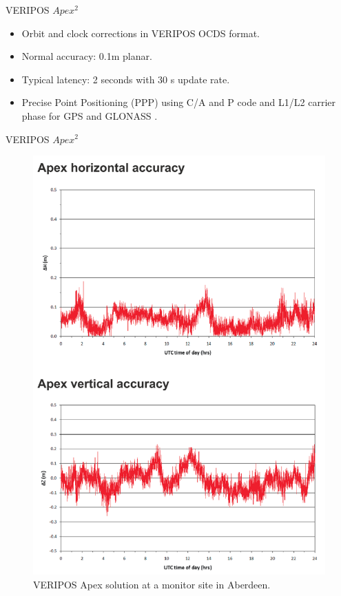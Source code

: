 \documentclass[11pt]{beamer}
\begin{document}
\begin{frame}{VERIPOS $Apex^2$}
	
	\begin{itemize}	
		\item Orbit and clock corrections in VERIPOS OCDS format.
		\item Normal accuracy: 0.1m planar. 
		\item Typical latency: 2 seconds with 30 s update rate.%
		\item Precise Point Positioning (PPP) using C/A and P code and L1/L2 carrier phase for GPS and GLONASS .
	\end{itemize}	


	
\end{frame}	


\begin{frame}[plain]{VERIPOS  $Apex^2$}
	
	\begin{figure}
		
		\includegraphics[height=0.8\textheight]{pic/Apex.png}
		\caption{VERIPOS Apex solution at a monitor site in Aberdeen.}
	\end{figure}
	
\end{frame}
\end{document}
